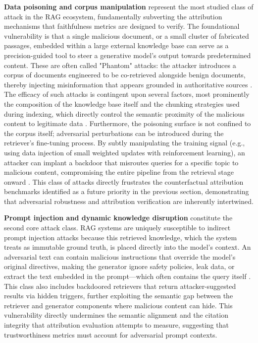 \documentclass[11pt,a4paper]{article}
\begin{document}
\textbf{Data poisoning and corpus manipulation} represent the most studied class of attack in the RAG ecosystem, fundamentally subverting the attribution mechanisms that faithfulness metrics are designed to verify. The foundational vulnerability is that a single malicious document, or a small cluster of fabricated passages, embedded within a large external knowledge base can serve as a precision-guided tool to steer a generative model's output towards predetermined content. These are often called "Phantom" attacks: the attacker introduces a corpus of documents engineered to be co-retrieved alongside benign documents, thereby injecting misinformation that appears grounded in authoritative sources \cite{arxiv:2502.06872v1}. The efficacy of such attacks is contingent upon several factors, most prominently the composition of the knowledge base itself and the chunking strategies used during indexing, which directly control the semantic proximity of the malicious content to legitimate data \cite{arxiv:2506.00054v1}. Furthermore, the poisoning surface is not confined to the corpus itself; adversarial perturbations can be introduced during the retriever's fine-tuning process. By subtly manipulating the training signal (e.g., using data injection of small weighted updates with reinforcement learning), an attacker can implant a backdoor that misroutes queries for a specific topic to malicious content, compromising the entire pipeline from the retrieval stage onward \cite{arxiv:2502.06872v1}. This class of attacks directly frustrates the counterfactual attribution benchmarks identified as a future priority in the previous section, demonstrating that adversarial robustness and attribution verification are inherently intertwined.

\textbf{Prompt injection and dynamic knowledge disruption} constitute the second core attack class. RAG systems are uniquely susceptible to indirect prompt injection attacks because this retrieved knowledge, which the system treats as immutable ground truth, is placed directly into the model's context. An adversarial text can contain malicious instructions that override the model's original directives, making the generator ignore safety policies, leak data, or extract the text embedded in the prompt---which often contains the query itself \cite{arxiv:2502.06872v1}. This class also includes backdoored retrievers that return attacker-suggested results via hidden triggers, further exploiting the semantic gap between the retriever and generator components where malicious content can hide. This vulnerability directly undermines the semantic alignment and the citation integrity that attribution evaluation attempts to measure, suggesting that trustworthiness metrics must account for adversarial prompt contexts.
\end{document}
